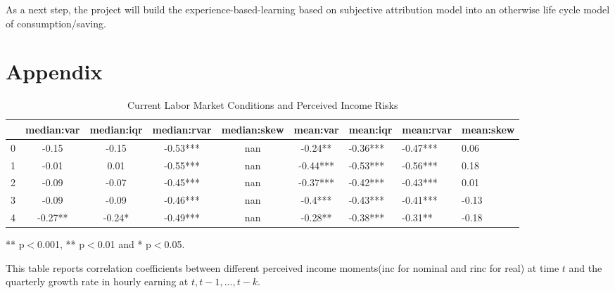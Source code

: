 \documentclass[12pt,notitlepage,onecolumn,aps,pra]{article}
\begin{document}
As a next step, the project will build the experience-based-learning
based on subjective attribution model into an otherwise life cycle model
of consumption/saving.

    \hypertarget{appendix}{%
\section{Appendix}\label{appendix}}


       
\begin{table}[ht]
\centering
\begin{adjustbox}{width={\textwidth}}
\begin{threeparttable}
\caption{Current Labor Market Conditions and Perceived Income Risks}
\label{macro_corr_he}
\begin{tabular}{cccccclll}
\toprule
{} & median:var & median:iqr & median:rvar & median:skew &  mean:var &  mean:iqr & mean:rvar & mean:skew \\
\midrule
0 &      -0.15 &      -0.15 &    -0.53*** &         nan &   -0.24** &  -0.36*** &  -0.47*** &      0.06 \\
1 &      -0.01 &       0.01 &    -0.55*** &         nan &  -0.44*** &  -0.53*** &  -0.56*** &      0.18 \\
2 &      -0.09 &      -0.07 &    -0.45*** &         nan &  -0.37*** &  -0.42*** &  -0.43*** &      0.01 \\
3 &      -0.09 &      -0.09 &    -0.46*** &         nan &   -0.4*** &  -0.43*** &  -0.41*** &     -0.13 \\
4 &    -0.27** &     -0.24* &    -0.49*** &         nan &   -0.28** &  -0.38*** &   -0.31** &     -0.18 \\
\bottomrule
\end{tabular}
\begin{tablenotes}
\item *** p$<$0.001, ** p$<$0.01 and * p$<$0.05.
\item This table reports correlation coefficients between different perceived income moments(inc for nominal
and rinc for real) at time
$t$ and the quarterly growth rate in hourly earning at $t,t-1,...,t-k$.
\end{tablenotes}
\end{threeparttable}
\end{adjustbox}
\end{table}
\end{document}

